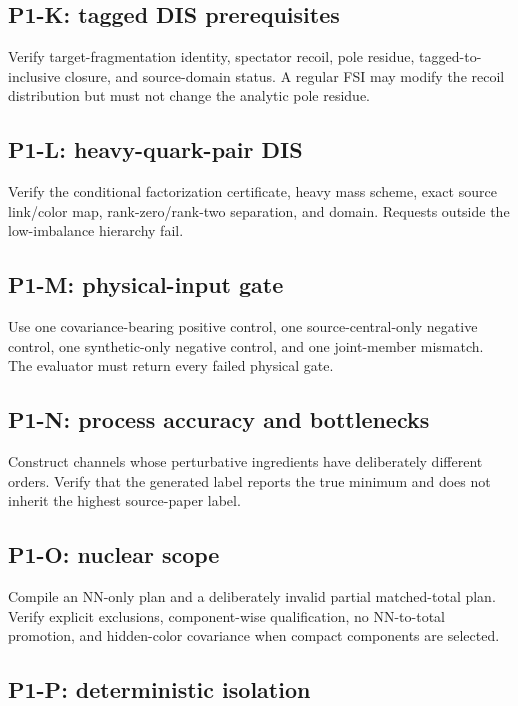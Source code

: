 \documentclass[11pt]{article}
\begin{document}
\subsection{P1-K: tagged DIS prerequisites}

Verify target-fragmentation identity, spectator recoil, pole residue, tagged-to-inclusive closure, and source-domain status.  A regular FSI may modify the recoil distribution but must not change the analytic pole residue.

\subsection{P1-L: heavy-quark-pair DIS}

Verify the conditional factorization certificate, heavy mass scheme, exact source link/color map, rank-zero/rank-two separation, and domain.  Requests outside the low-imbalance hierarchy fail.

\subsection{P1-M: physical-input gate}

Use one covariance-bearing positive control, one source-central-only negative control, one synthetic-only negative control, and one joint-member mismatch.  The evaluator must return every failed physical gate.

\subsection{P1-N: process accuracy and bottlenecks}

Construct channels whose perturbative ingredients have deliberately different orders.  Verify that the generated label reports the true minimum and does not inherit the highest source-paper label.

\subsection{P1-O: nuclear scope}

Compile an NN-only plan and a deliberately invalid partial matched-total plan.  Verify explicit exclusions, component-wise qualification, no NN-to-total promotion, and hidden-color covariance when compact components are selected.

\subsection{P1-P: deterministic isolation}
\end{document}
